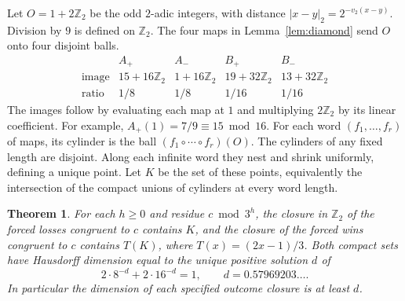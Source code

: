 \documentclass[11pt]{article}
\newtheorem{theorem}{Theorem}
\newcommand{\Z}{\mathbb Z}
\newcommand{\vTwo}{v_2}
\begin{document}
Let \(O=1+2\Z_2\) be the odd \(2\)-adic integers, with distance \(\lvert x-y\rvert_2=2^{-\vTwo(x-y)}\). Division by \(9\) is defined on \(\Z_2\). The four maps in Lemma~\ref{lem:diamond} send \(O\) onto four disjoint balls.
\[
\begin{array}{c|cccc}
 &A_+&A_-&B_+&B_-\\\hline
\text{image}&15+16\Z_2&1+16\Z_2&19+32\Z_2&13+32\Z_2\\
\text{ratio}&1/8&1/8&1/16&1/16
\end{array}
\]
The images follow by evaluating each map at \(1\) and multiplying \(2\Z_2\) by its linear coefficient. For example, \(A_+(1)=7/9\equiv15\bmod16\). For each word \((f_1,\ldots,f_r)\) of maps, its cylinder is the ball \((f_1\circ\cdots\circ f_r)(O)\). The cylinders of any fixed length are disjoint. Along each infinite word they nest and shrink uniformly, defining a unique point. Let \(K\) be the set of these points, equivalently the intersection of the compact unions of cylinders at every word length.

\begin{theorem}\label{thm:dim}
For each \(h\ge0\) and residue \(c\bmod3^h\), the closure in \(\Z_2\) of the forced losses congruent to \(c\) contains \(K\), and the closure of the forced wins congruent to \(c\) contains \(T(K)\), where \(T(x)=(2x-1)/3\). Both compact sets have Hausdorff dimension equal to the unique positive solution \(d\) of
\[
 2\cdot8^{-d}+2\cdot16^{-d}=1,\qquad d=0.57969203\ldots .
\]
In particular the dimension of each specified outcome closure is at least \(d\).
\end{theorem}
\end{document}
